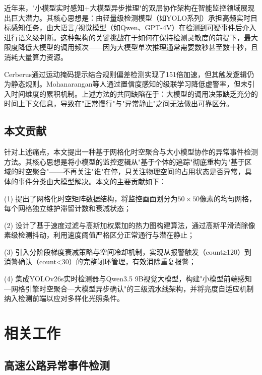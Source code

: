 \documentclass[10.5pt,a4paper,twoside,twocolumn]{ctexart}
\begin{document}
近年来，"小模型实时感知+大模型异步推理"的双层协作架构在智能监控领域展现出巨大潜力\cite{zheng2025,bai2023}。其核心思想是：由轻量级检测模型（如YOLO系列）承担高频实时目标感知任务，由大语言/视觉模型（如Qwen、GPT-4V）在检测到可疑事件后介入进行语义级判断。这种架构的关键挑战在于如何在保持检测灵敏度的前提下，最大限度降低大模型的调用频次——因为大模型单次推理通常需要数秒甚至数十秒，且消耗大量算力资源。

Cerberus\cite{zheng2025}通过运动掩码提示结合规则偏差检测实现了151倍加速，但其触发逻辑仍为静态规则。Mohanarangan等人\cite{mohanarangan2026}通过置信度感知的级联学习降低虚警率，但未引入时间维度的累积机制。上述方法的共同缺陷在于：大模型的调用决策缺乏充分的时间上下文信息，导致在"正常慢行"与"异常静止"之间无法做出可靠区分。

\subsection{本文贡献}

针对上述痛点，本文提出一种基于网格化时空聚合与大小模型协作的异常事件检测方法。其核心思想是将小模型的监控逻辑从"基于个体的追踪"彻底重构为"基于区域的时空聚合"——不再关注"谁"在停，只关注物理空间的占用状态是否异常，具体的事件分类由大模型解决。本文的主要贡献如下：

(1) 提出了网格化时空矩阵数据结构，将监控画面划分为$50\times50$像素的均匀网格，每个网格独立维护滞留计数和衰减状态；

(2) 设计了基于速度过滤与高斯加权累加的热力图构建算法，通过高斯平滑消除像素级检测抖动，利用速度阈值严格区分正常通行与潜在静止；

(3) 引入分阶段梯度衰减策略与空间冷却机制，实现从报警触发（count≥120）到消警确认（count<30）的完整闭环管理，有效消除重复报警；

(4) 集成YOLOv26s实时检测器与Qwen3.5 9B视觉大模型，构建"小模型前端感知—网格引擎时空聚合—大模型异步确认"的三级流水线架构，并将亮度自适应机制纳入检测前端以应对多样化光照条件。

\section{\heiti{} 相关工作}

\subsection{高速公路异常事件检测}
\end{document}
